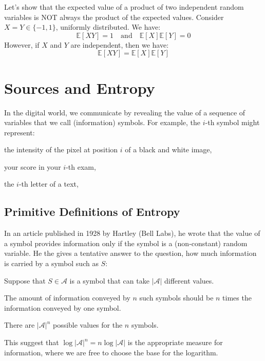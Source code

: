\begin{eg}
    Let's show that the expected value of a product of two independent random variables is NOT always the product of the expected values. Consider $X = Y \in \{-1, 1\}$, uniformly distributed. We have:
    \[
        \mathbb{E}[XY] = 1 \quad \text{and} \quad \mathbb{E}[X]\mathbb{E}[Y] = 0
    \]
    However, if $X$ and $Y$ are independent, then we have:
    \[
        \mathbb{E}[XY] = \mathbb{E}[X]\mathbb{E}[Y]
    \]
\end{eg}

\section{Sources and Entropy}
In the digital world, we communicate by revealing the value of a sequence of variables that we call (information) symbols. For example, the $i$-th symbol might represent:
\begin{citemize}
    \item the intensity of the pixel at position $i$ of a black and white image,
    \item your score in your $i$-th exam,
    \item the $i$-th letter of a text,
\end{citemize}

\subsection{Primitive Definitions of Entropy}
In an article published in 1928 by Hartley (Bell Labs), he wrote that the value of a symbol provides information only if the symbol is a (non-constant) random variable. He the gives a tentative answer to the question, how much information is carried by a symbol such as $S$:
\begin{citemize}
    \item Suppose that $S \in \mathcal{A}$ is a symbol that can take $|\mathcal{A}|$ different values.
    \item The amount of information conveyed by $n$ such symbols should be $n$ times the information conveyed by one symbol.
    \item There are $|\mathcal{A}|^n$ possible values for the $n$ symbols.
    \item This suggest that $\log|\mathcal{A}|^n = n \log |\mathcal{A}|$ is the appropriate measure for information, where we are free to choose the base for the logarithm.
\end{citemize}

